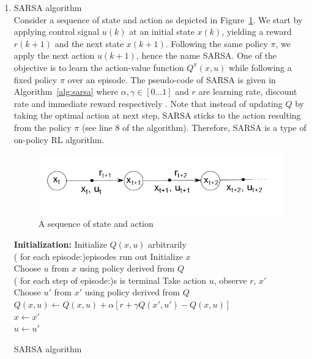 \begin{enumerate}
	\item \ac{SARSA} algorithm \\
	Consider a sequence of state and action as depicted in Figure~\ref{fig:sarsa}. We start by applying control signal $ u(k) $ at an initial state $ x(k) $, yielding a reward $ r(k+1) $ and the next state $ x(k+1)$. Following the same policy $\pi$, we apply the next action $ u(k+1) $, hence the name \ac {SARSA}. One of the objective is to learn the action-value function $ Q^{\pi}(x,u) $ while following a fixed policy $ \pi $ over an episode. The pseudo-code of \ac{SARSA} is given in Algorithm~\ref{alg:sarsa} where $ \alpha, \gamma \in [0 \dots 1]$ and $r$ are learning rate, discount rate and immediate reward respectively \cite{sutton1998reinforcement}. Note that instead of updating $Q$ by taking the optimal action at next step, \ac {SARSA} sticks to the action resulting from the policy $\pi$ (see line 8 of the algorithm). Therefore, \ac {SARSA} is a type of on-policy \ac {RL} algorithm.
	
	
	\begin{figure}[h!]
		\centering
		\includegraphics[width=0.7\linewidth]{sarsa}
		\caption{A sequence of state and action}
		\label{fig:sarsa}
	\end{figure}
	
	\begin{algorithm}[H]
		\textbf{Initialization:} Initialize $ Q(x,u) $ arbitrarily\\
		\Repeat( for each episode:){episodes run out}{
			Initialize $ x $ \\
			Choose $ u $ from $ x $ using policy derived from $ Q $ \\
			\Repeat ( for each step of episode:){s is terminal}{
				Take action $ u $, observe $ r $, $ x' $ \\
				Choose $ u' $ from $ x' $ using policy derived from $ Q $ \\
				$ Q(x,u) \leftarrow Q(x,u) + \alpha[r+\gamma Q(x',u')-Q(x,u)] $	\\
				$ x \leftarrow  x' $\\
				$ u \leftarrow  u' $
			}
		} 		
		\label{alg:sarsa}
		\caption{SARSA algorithm}
	\end{algorithm}
	

\end{enumerate}
